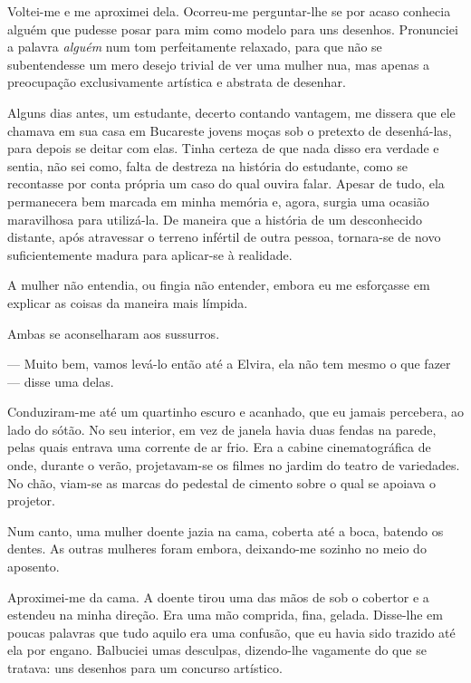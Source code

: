 
Voltei-me e me aproximei dela. Ocorreu-me perguntar-lhe se por acaso conhecia
alguém que pudesse posar para mim como modelo para uns desenhos. Pronunciei a
palavra \textit{alguém} num tom perfeitamente relaxado, para que não se
subentendesse um mero desejo trivial de ver uma mulher nua, mas apenas a
preocupação exclusivamente artística e abstrata de desenhar.

Alguns dias antes, um estudante, decerto contando vantagem, me dissera que ele
chamava em sua casa em Bucareste jovens moças sob o pretexto de desenhá-las,
para depois se deitar com elas. Tinha certeza de que nada disso era verdade e
sentia, não sei como, falta de destreza na história do estudante, como se
recontasse por conta própria um caso do qual ouvira falar. Apesar de tudo,
ela permanecera bem marcada em minha memória e, agora, surgia uma ocasião
maravilhosa para utilizá-la. De maneira que a história de um desconhecido
distante, após atravessar o terreno infértil de outra pessoa, tornara-se de
novo suficientemente madura para aplicar-se à realidade.

A mulher não entendia, ou fingia não entender, embora eu me esforçasse em
explicar as coisas da maneira mais límpida.


Ambas se aconselharam aos sussurros.

--- Muito bem, vamos levá-lo então até a Elvira, ela não tem mesmo o que
    fazer --- disse uma delas.

Conduziram-me até um quartinho escuro e acanhado, que eu jamais percebera, ao
lado do sótão. No seu interior, em vez de janela havia duas fendas na parede,
pelas quais entrava uma corrente de ar frio. Era a cabine cinematográfica de
onde, durante o verão, projetavam-se os filmes no jardim do teatro de
variedades. No chão, viam-se as marcas do pedestal de cimento sobre o qual se
apoiava o projetor.

Num canto, uma mulher doente jazia na cama, coberta até a boca, batendo os
dentes. As outras mulheres foram embora, deixando-me sozinho no meio do
aposento.

Aproximei-me da cama. A doente tirou uma das mãos de sob o cobertor e a
estendeu na minha direção. Era uma mão comprida, fina, gelada. Disse-lhe em
poucas palavras que tudo aquilo era uma confusão, que eu havia sido trazido
até ela por engano. Balbuciei umas desculpas, dizendo-lhe vagamente do que se
tratava: uns desenhos para um concurso artístico.


